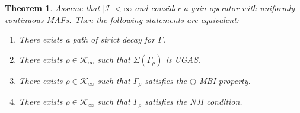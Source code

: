 \documentclass[10pt,a4paper]{amsart}
\newtheorem{theorem}{Theorem}
\newcommand{\IC}{\mathcal{I}}
\newcommand{\KC}{\mathcal{K}}
\begin{document}
\begin{theorem}\label{thm_finite_general_case}
Assume that $|\IC| < \infty$ and consider a gain operator with uniformly continuous MAFs. Then the following statements are equivalent:%
\begin{enumerate}
\item[(a)] There exists a path of strict decay for $\Gamma$.%
\item[(b)] There exists $\rho \in \KC_{\infty}$ such that $\Sigma(\Gamma_{\rho})$ is UGAS.
\item[(c)] There exists $\rho \in \KC_{\infty}$ such that $\Gamma_{\rho}$ satisfies the $\oplus$-MBI property.%
\item[(d)] There exists $\rho \in \KC_{\infty}$ such that $\Gamma_{\rho}$ satisfies the NJI condition.%
\end{enumerate}
\end{theorem}
\end{document}
